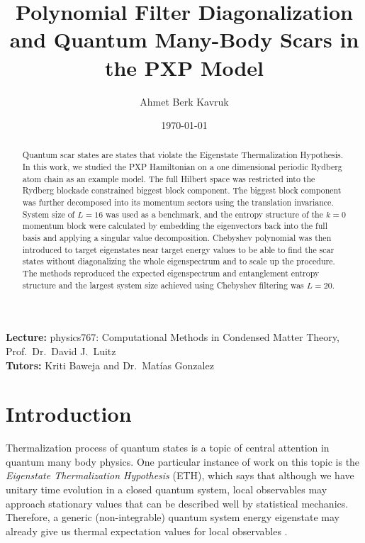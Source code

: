 \documentclass[%
 reprint,
 amsmath,amssymb,
 aps,
]{revtex4-2}
\begin{document}
\title{Polynomial Filter Diagonalization and Quantum Many-Body Scars in the PXP Model}%

\author{Ahmet Berk Kavruk}

\date{\today}

\begin{abstract}
Quantum scar states are states that violate the Eigenstate Thermalization Hypothesis. In this work, we studied the PXP Hamiltonian on a one dimensional periodic Rydberg atom chain as an example model. The full Hilbert space was restricted into the Rydberg blockade constrained biggest block component. The biggest block component was further decomposed into its momentum sectors using the translation invariance. System size of $L = 16$ was used as a benchmark, and the entropy structure of the $k = 0$ momentum block were calculated by embedding the eigenvectors back into the full basis and applying a singular value decomposition. Chebyshev polynomial was then introduced to target eigenstates near target energy values to be able to find the scar states without diagonalizing the whole eigenspectrum and to scale up the procedure. The methods reproduced the expected eigenspectrum and entanglement entropy structure and the largest system size achieved using Chebyshev filtering was $L = 20$.
\end{abstract}

\maketitle

\noindent
\textbf{Lecture:} physics767: Computational Methods in Condensed Matter Theory, Prof.~Dr.~David J.~Luitz\\
\textbf{Tutors:} Kriti Baweja and Dr.~Matías Gonzalez


\section{\label{sec:introduction} Introduction}

Thermalization process of quantum states is a topic of central attention in quantum many body physics. One particular instance of work on this topic is the \textit{Eigenstate Thermalization Hypothesis} (ETH), which says that although we have unitary time evolution in a closed quantum system, local observables may approach stationary values that can be described well by statistical mechanics. Therefore, a generic (non-integrable) quantum system energy eigenstate may already give us thermal expectation values for local observables \cite{Deutsch_2018, Turner_2018}.
\end{document}
